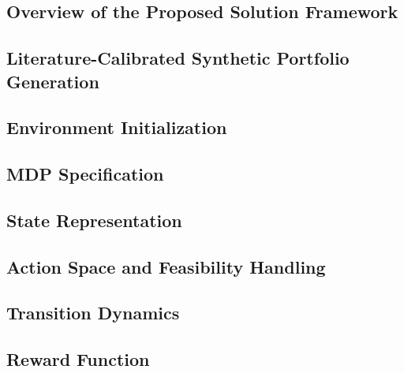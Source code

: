 \subsection{Overview of the Proposed Solution Framework}
\label{subsec:solution_framework}

\subsection{Literature-Calibrated Synthetic Portfolio Generation}
\label{subsec:synthetic_portfolio_generation}

\subsection{Environment Initialization}
\label{subsec:environment_initialization}

\subsection{MDP Specification}
\label{subsec:mdp_specification}

\subsection{State Representation}
\label{subsec:state_representation}

\subsection{Action Space and Feasibility Handling}
\label{subsec:action_space}

\subsection{Transition Dynamics}
\label{subsec:transition_dynamics}

\subsection{Reward Function}
\label{subsec:reward_function}

